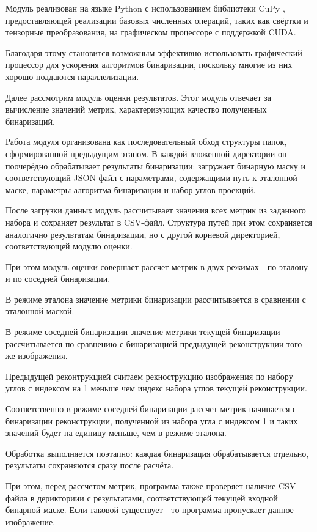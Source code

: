 Модуль реализован на языке Python с использованием библиотеки CuPy \cite{cuPy}, предоставляющей реализации базовых численных операций, таких как свёртки и тензорные преобразования, на графическом процессоре с поддержкой CUDA. 

Благодаря этому становится возможным эффективно использовать графический процессор для ускорения алгоритмов бинаризации, поскольку многие из них хорошо поддаются параллелизации.

Далее рассмотрим модуль оценки результатов. Этот модуль отвечает за вычисление значений метрик, характеризующих качество полученных бинаризаций.

Работа модуля организована как последовательный обход структуры папок, сформированной предыдущим этапом. В каждой вложенной директории он поочерёдно обрабатывает результаты бинаризации: загружает бинарную маску и соответствующий JSON-файл с параметрами, содержащими путь к эталонной маске, параметры алгоритма бинаризации и набор углов проекций.

После загрузки данных модуль рассчитывает значения всех метрик из заданного набора и сохраняет результат в CSV-файл. Структура путей при этом сохраняется аналогично результатам бинаризации, но с другой корневой директорией, соответствующей модулю оценки.

При этом модуль оценки совершает рассчет метрик в двух режимах - по эталону и по соседней бинаризации.

В режиме эталона значение метрики бинаризации рассчитывается в сравнении с эталонной маской. 

В режиме соседней бинаризации значение метрики текущей бинаризации рассчитывается по сравнению с бинаризацией предыдущей реконструкции того же изображения.

Предыдущей реконтрукцией считаем рекнострукцию изображения по набору углов с индексом на 1 меньше чем индекс набора углов текущей реконструкции. 

Соответственно в режиме соседней бинаризации рассчет метрик начинается с бинаризации реконструкции, полученной из набора угла с индексом 1 и таких значений будет на единицу меньше, чем в режиме эталона.

Обработка выполняется поэтапно: каждая бинаризация обрабатывается отдельно, результаты сохраняются сразу после расчёта. 

При этом, перед рассчетом метрик, программа также проверяет наличие CSV файла в дерикториии с результатами, соответствующей текущей входной бинарной маске. Если таковой существует - то программа пропускает данное изображение.

